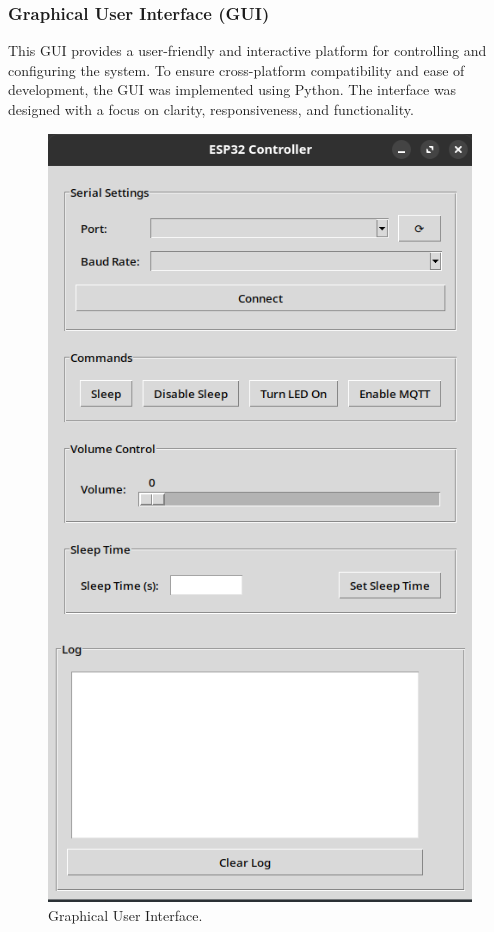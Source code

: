 \subsubsection{Graphical User Interface (GUI) }

This GUI provides a user-friendly and interactive platform for controlling and configuring the system. To ensure cross-platform compatibility and ease of development, the GUI was implemented using Python. The interface was designed with a focus on clarity, responsiveness, and functionality.

\begin{figure}[H]
    \centering
    \includegraphics*[scale = 0.3]{Images/GUI.png}
    \caption{Graphical User Interface.}
    \label{fig:GUI}
\end{figure}

